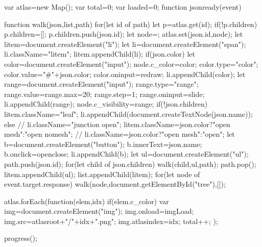             var atlas=new Map();
            var total=0;
            var loaded=0;
            function jsonready(event){
                function walk(json,list,path){
                    for(let id of path){
                        let p=atlas.get(id);
                        if(!p.children)
                            p.children=[];
                        p.children.push(json.id);
                    }
                    let node={};
                    atlas.set(json.id,node);
                    let litem=document.createElement("li");
                    let li=document.createElement("span");
                    li.className="litem";
                    litem.appendChild(li);
                    if(json.color){
                        let color=document.createElement("input");
                        node.c_color=color;
                        color.type="color";
                        color.value="#"+json.color;
                        color.oninput=redraw;
                        li.appendChild(color);
                    }
                    let range=document.createElement("input");
                    range.type="range";
                    range.value=range.max=20;
                    range.step=1;
                    range.oninput=slide;
                    li.appendChild(range);
                    node.c_visibility=range;
                    if(!json.children){
                        litem.className="leaf";
                        li.appendChild(document.createTextNode(json.name));
                    }else{
//                        li.className="junction open";
                        litem.className=json.color?"open mesh":"open nomesh";
//                        li.className=json.color?"open mesh":"open";
                        let b=document.createElement("button");
                        b.innerText=json.name;
                        b.onclick=openclose;
                        li.appendChild(b);
                        let ul=document.createElement("ul");
                        path.push(json.id);
                        for(let child of json.children)
                            walk(child,ul,path);
                        path.pop();
                        litem.appendChild(ul);
                    }
                    list.appendChild(litem);
                }
                for(let node of event.target.response)
                    walk(node,document.getElementById("tree"),[]);
                
                atlas.forEach(function(elem,idx){
                    if(elem.c_color){
                        var img=document.createElement("img");
                        img.onload=imgLoad;
                        img.src=atlasroot+"/"+idx+".png";
                        img.atlasindex=idx;
                        total++;
                    }
                });
                
                progress();
            }
